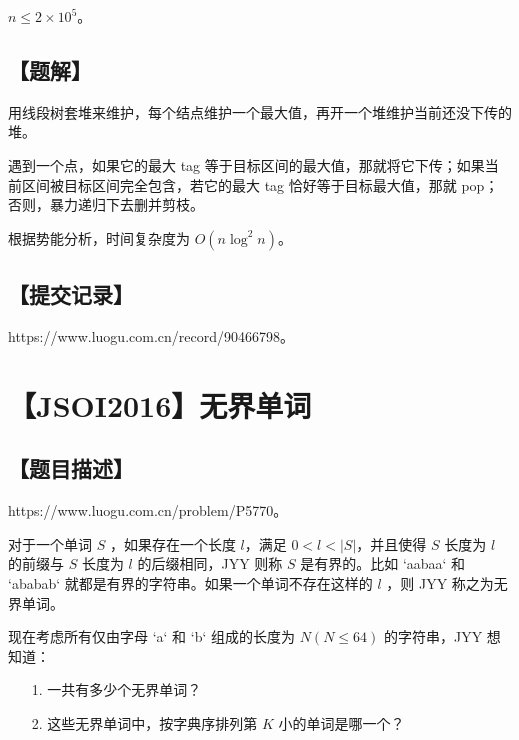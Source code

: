 \documentclass[UTF8,12pt,a4paper]{ctexart}
\begin{document}
	$n\le 2\times 10^5$。
	
	\subsection*{【题解】}
	
	用线段树套堆来维护，每个结点维护一个最大值，再开一个堆维护当前还没下传的堆。
	
	遇到一个点，如果它的最大 tag 等于目标区间的最大值，那就将它下传；如果当前区间被目标区间完全包含，若它的最大 tag 恰好等于目标最大值，那就 pop；否则，暴力递归下去删并剪枝。
	
	根据势能分析，时间复杂度为 $O(n\log^2n)$。
	
	\subsection*{【提交记录】}
	
	https://www.luogu.com.cn/record/90466798。
	
	
	\section*{【JSOI2016】无界单词}
	
	\subsection*{【题目描述】}
	
	https://www.luogu.com.cn/problem/P5770。
	
	对于一个单词 $S$ ，如果存在一个长度 $l$，满足 $0 < l < |S|$，并且使得 $S$ 长度为 $l$ 的前缀与 $S$ 长度为 $l$ 的后缀相同，JYY 则称 $S$ 是有界的。比如 `aabaa` 和 `ababab` 就都是有界的字符串。如果一个单词不存在这样的 $l$ ，则 JYY 称之为无界单词。
	
	现在考虑所有仅由字母 `a` 和 `b` 组成的长度为 $N(N\le 64)$ 的字符串，JYY 想知道：
	
	\begin{itemize}
		\item [1.] 一共有多少个无界单词？
		\item [2.] 这些无界单词中，按字典序排列第 $K$ 小的单词是哪一个？
	\end{itemize}
	
\end{document}
